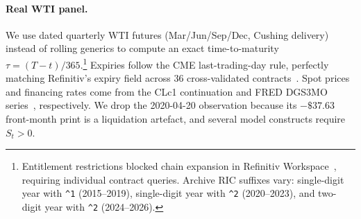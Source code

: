 \documentclass[sigconf, authorversion=true, nonacm=true]{acmart}
\begin{document}
%
\paragraph{Real WTI panel.} We use dated quarterly WTI futures (Mar/Jun/Sep/Dec, Cushing delivery) instead of rolling generics to compute an exact time-to-maturity $\tau = (T-t)/365$.\footnote{Entitlement restrictions blocked chain expansion in Refinitiv Workspace~\cite{refinitiv2026eikon}, requiring individual contract queries. Archive RIC suffixes vary: single-digit year with \texttt{\^{}1} (2015--2019), single-digit year with \texttt{\^{}2} (2020--2023), and two-digit year with \texttt{\^{}2} (2024--2026).} Expiries follow the CME last-trading-day rule, perfectly matching Refinitiv's expiry field across $36$ cross-validated contracts~\cite{refinitiv2026eikon}. Spot prices and financing rates come from the CLc1 continuation and FRED DGS3MO series~\cite{refinitiv2026eikon, fred2026dgs3mo}, respectively. We drop the 2020-04-20 observation because its $-\$37.63$ front-month print is a liquidation artefact, and several model constructs require $S_t > 0$.
\end{document}
